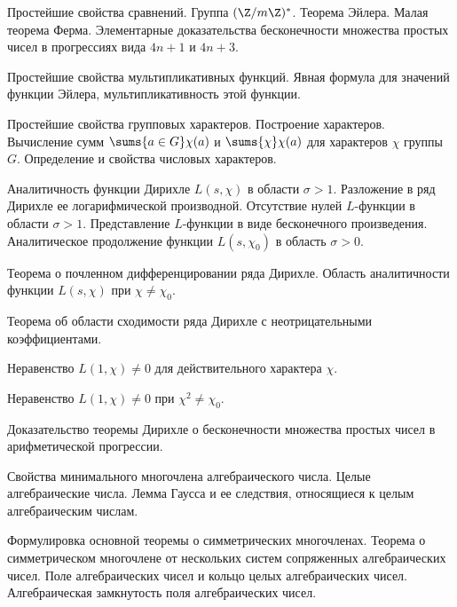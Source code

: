 \documentclass[a4paper,draft]{article}
\begin{document}
\begin{nums}{0}
\item Простейшие свойства сравнений. Группа  $(\Z/m\Z)^*$. Теорема
Эйлера. Малая теорема Ферма. Элементарные доказательства
бесконечности множества простых чисел в прогрессиях вида  $4n+1$ и
$4n+3$.

\item Простейшие свойства мультипликативных функций. Явная формула
для значений функции Эйлера,  мультипликативность этой функции.

\item Простейшие свойства групповых характеров. Построение
характеров. Вычисление сумм  $\sums{a \in G} \chi (a)$ и
$\sums{\chi} \chi (a)$ для характеров $\chi$
 группы $G$. Определение и свойства числовых характеров.

\item Аналитичность функции Дирихле $L(s, \chi)$   в области
$\sigma >1$. Разложение в ряд Дирихле ее логарифмической
производной. Отсутствие нулей $L$-функции  в области
$\sigma >1$. Представление $L$-функции в виде бесконечного произведения.
Аналитическое продолжение функции  $L(s, \chi_0)$ в область
$\sigma >0$.

\item Теорема о почленном дифференцировании ряда Дирихле. Область
аналитичности функции  $L(s, \chi)$  при $\chi \ne \chi_0$.

\item Теорема об области сходимости ряда Дирихле с неотрицательными
коэффициентами.

\item Неравенство $L(1, \chi ) \ne 0$   для действительного
характера $\chi$.

\item Неравенство $L(1, \chi ) \ne 0$   при $\chi^2 \ne \chi_0$.

\item Доказательство теоремы Дирихле о бесконечности множества
простых чисел в арифметической прогрессии.

\item Свойства минимального многочлена алгебраического числа. Целые
алгебраические числа. Лемма Гаусса и ее следствия, относящиеся к
целым алгебраическим числам.

\item Формулировка основной теоремы о симметрических многочленах.
Теорема о симметрическом многочлене от нескольких систем
сопряженных алгебраических чисел. Поле алгебраических чисел и
кольцо целых алгебраических чисел. Алгебраическая замкнутость поля
алгебраических чисел.


\end{nums}
\end{document}
